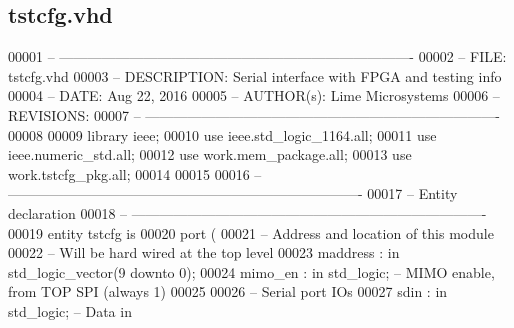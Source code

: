 \subsection{tstcfg.\+vhd}
\label{spi_2tstcfg_8vhd_source}

\begin{DoxyCode}
00001 \textcolor{keyword}{-- ---------------------------------------------------------------------------- }
00002 \textcolor{keyword}{-- FILE: tstcfg.vhd}
00003 \textcolor{keyword}{-- DESCRIPTION: Serial interface with FPGA and testing info}
00004 \textcolor{keyword}{-- DATE: Aug 22, 2016}
00005 \textcolor{keyword}{-- AUTHOR(s): Lime Microsystems}
00006 \textcolor{keyword}{-- REVISIONS: }
00007 \textcolor{keyword}{-- ---------------------------------------------------------------------------- }
00008 
00009 \textcolor{vhdlkeyword}{library }\textcolor{keywordflow}{ieee};
00010 \textcolor{vhdlkeyword}{use }ieee.std\_logic\_1164.\textcolor{keywordflow}{all};
00011 \textcolor{vhdlkeyword}{use }ieee.numeric\_std.\textcolor{keywordflow}{all};
00012 \textcolor{vhdlkeyword}{use }work.mem_package.\textcolor{keywordflow}{all};
00013 \textcolor{vhdlkeyword}{use }work.tstcfg_pkg.\textcolor{keywordflow}{all};
00014 
00015 
00016 \textcolor{keyword}{-- ----------------------------------------------------------------------------}
00017 \textcolor{keyword}{-- Entity declaration}
00018 \textcolor{keyword}{-- ----------------------------------------------------------------------------}
00019 \textcolor{keywordflow}{entity }tstcfg \textcolor{keywordflow}{is}
00020    \textcolor{keywordflow}{port} \textcolor{vhdlchar}{(}
00021 \textcolor{keyword}{      -- Address and location of this module}
00022 \textcolor{keyword}{      -- Will be hard wired at the top level}
00023       \textcolor{vhdlchar}{maddress}             \textcolor{vhdlchar}{:} \textcolor{keywordflow}{in} \textcolor{comment}{std\_logic\_vector}\textcolor{vhdlchar}{(}\textcolor{vhdllogic}{}\textcolor{vhdllogic}{9} \textcolor{keywordflow}{downto} \textcolor{vhdllogic}{}\textcolor{vhdllogic}{0}\textcolor{vhdlchar}{)};
00024       \textcolor{vhdlchar}{mimo_en}              \textcolor{vhdlchar}{:} \textcolor{keywordflow}{in} \textcolor{comment}{std\_logic};\textcolor{keyword}{   -- MIMO enable, from TOP SPI (always 1)}
00025    
00026 \textcolor{keyword}{      -- Serial port IOs}
00027       \textcolor{vhdlchar}{sdin}                 \textcolor{vhdlchar}{:} \textcolor{keywordflow}{in} \textcolor{comment}{std\_logic};\textcolor{keyword}{   -- Data in}

\end{DoxyCode}
